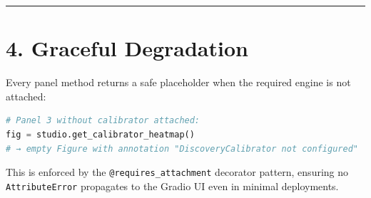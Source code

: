 \medskip\noindent\rule{\linewidth}{0.4pt}\medskip

\section*{4. Graceful Degradation}

Every panel method returns a safe placeholder when the required engine is not attached:

\begin{lstlisting}[language=Python]
# Panel 3 without calibrator attached:
fig = studio.get_calibrator_heatmap()
# → empty Figure with annotation "DiscoveryCalibrator not configured"
\end{lstlisting}

This is enforced by the \texttt{@requires\_attachment} decorator pattern, ensuring no \texttt{AttributeError} propagates to the Gradio UI even in minimal deployments.